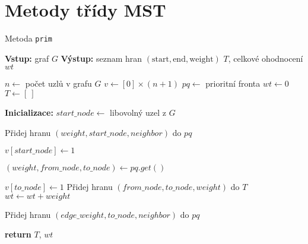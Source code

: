 \section{Metody třídy MST} \label{AppenB}
\begin{algorithm}
    \caption{Metoda \texttt{prim}}
    \begin{algorithmic}[1]
        \STATE \textbf{Vstup:} graf $G$
        \STATE \textbf{Výstup:} seznam hran $(\text{start}, \text{end}, \text{weight})$ $T$, celkové ohodnocení $wt$
        
        \STATE $n \gets$ počet uzlů v grafu $G$
        \STATE $v \gets [0] \times (n+1)$
        \STATE $pq \gets$ prioritní fronta 
        \STATE $wt \gets 0$ 
        \STATE $T \gets [~]$ 

        \STATE \textbf{Inicializace:}
        \STATE $start\_node \gets$ libovolný uzel z $G$ 
        
            \STATE Přidej hranu $(weight, start\_node, neighbor)$ do $pq$
        \ENDFOR

        \STATE $v[start\_node] \gets 1$

            \STATE $(weight, from\_node, to\_node) \gets pq.get()$
            
                \STATE $v[to\_node] \gets 1$
                \STATE Přidej hranu $(from\_node, to\_node, weight)$ do $T$
                \STATE $wt \gets wt + weight$ 

                        \STATE Přidej hranu $(edge\_weight, to\_node, neighbor)$ do $pq$
                    \ENDIF
                \ENDFOR
            \ENDIF
        \ENDWHILE

        \STATE \textbf{return} $T$, $wt$
    \end{algorithmic}
\end{algorithm}

